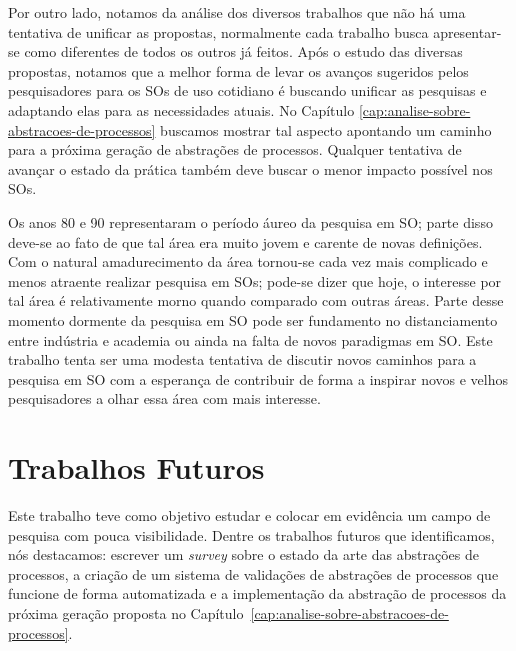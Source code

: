 Por outro lado, notamos da análise dos diversos trabalhos que não há uma
tentativa de unificar as propostas, normalmente cada trabalho busca
apresentar-se como diferentes de todos os outros já feitos. Após o estudo das
diversas propostas, notamos que a melhor forma de levar os avanços sugeridos
pelos pesquisadores para os SOs de uso cotidiano é buscando unificar as
pesquisas e adaptando elas para as necessidades atuais. No Capítulo
\ref{cap:analise-sobre-abstracoes-de-processos} buscamos mostrar tal aspecto
apontando um caminho para a próxima geração de abstrações de processos.
Qualquer tentativa de avançar o estado da prática também deve buscar o menor
impacto possível nos SOs.

Os anos 80 e 90 representaram o período áureo da pesquisa em SO; parte disso
deve-se ao fato de que tal área era muito jovem e carente de novas
definições. Com o natural amadurecimento da área tornou-se cada vez mais
complicado e menos atraente realizar pesquisa em SOs; pode-se dizer que hoje, o
interesse por tal área é relativamente morno quando comparado com outras áreas.
Parte desse momento dormente da pesquisa em SO pode ser fundamento no
distanciamento entre indústria e academia ou ainda na falta de novos
paradigmas em SO. Este trabalho tenta ser uma modesta tentativa de discutir
novos caminhos para a pesquisa em SO com a esperança de contribuir de forma a
inspirar novos e velhos pesquisadores a olhar essa área com mais interesse.

\section{Trabalhos Futuros}


Este trabalho teve como objetivo estudar e colocar em evidência um campo de
pesquisa com pouca visibilidade. Dentre os trabalhos futuros que identificamos,
nós destacamos: escrever um \textit{survey} sobre o estado da arte das
abstrações de processos, a criação de um sistema de validações de abstrações de
processos que funcione de forma automatizada e a implementação da abstração de
processos da próxima geração proposta no
Capítulo~\ref{cap:analise-sobre-abstracoes-de-processos}.

